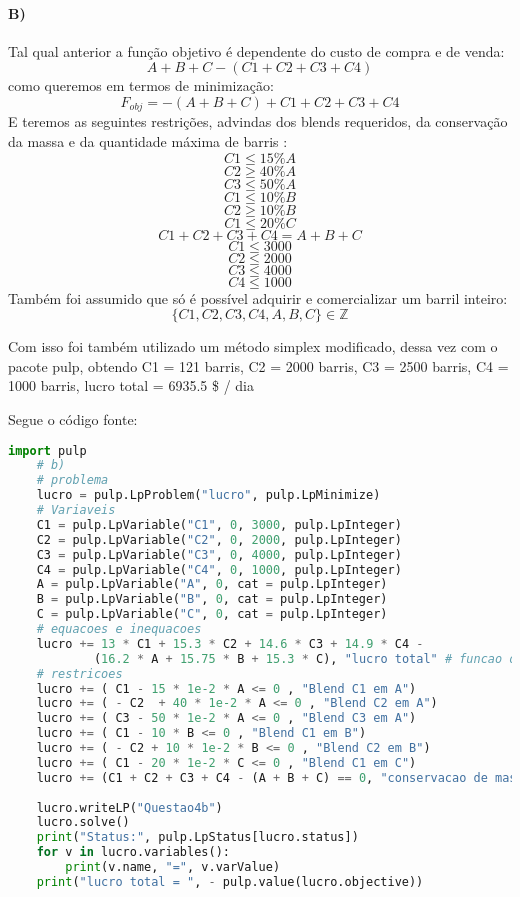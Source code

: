 \documentclass[]{article} %
\begin{document}
\paragraph{B)}
Tal qual anterior a função objetivo é dependente do custo de compra e de venda:
\[ A + B + C - (C1 + C2 + C3 + C4) \]
como queremos em termos de minimização:
\[ F_{obj} = - ( A + B + C ) + C1 + C2 + C3 + C4 \]
E teremos as seguintes restrições, advindas dos blends requeridos, da conservação da massa e da quantidade máxima de barris :
\[ C1 \leqslant  15 \% A \]
\[ C2 \geqslant 40\% A \]
\[ C3 \leqslant  50 \% A \]
\[ C1 \leqslant 10\% B \]
\[ C2 \geqslant 10\% B \]
\[ C1 \leqslant 20\% C \]
\[ C1 + C2 + C3 + C4 = A + B + C \]
\[ C1 \leqslant 3000 \]
\[ C2 \leqslant 2000 \]
\[ C3 \leqslant 4000 \]
\[ C4 \leqslant 1000 \]
Também foi assumido que só é possível adquirir e comercializar um barril inteiro:
\[ \{C1, C2, C3, C4, A, B, C\} \in \mathbb{Z} \]

Com isso foi também utilizado um método simplex modificado, dessa vez com o pacote pulp, obtendo
C1 = 121 barris,
C2 = 2000 barris,
C3 = 2500 barris,
C4 = 1000 barris, lucro total =  6935.5 \$ / dia

Segue o código fonte:
\begin{lstlisting}[language=Python, basicstyle=\small]
    import pulp
    # b)
    # problema
    lucro = pulp.LpProblem("lucro", pulp.LpMinimize)
    # Variaveis
    C1 = pulp.LpVariable("C1", 0, 3000, pulp.LpInteger)
    C2 = pulp.LpVariable("C2", 0, 2000, pulp.LpInteger)
    C3 = pulp.LpVariable("C3", 0, 4000, pulp.LpInteger)
    C4 = pulp.LpVariable("C4", 0, 1000, pulp.LpInteger)
    A = pulp.LpVariable("A", 0, cat = pulp.LpInteger)
    B = pulp.LpVariable("B", 0, cat = pulp.LpInteger)
    C = pulp.LpVariable("C", 0, cat = pulp.LpInteger)
    # equacoes e inequacoes
    lucro += 13 * C1 + 15.3 * C2 + 14.6 * C3 + 14.9 * C4 - 
            (16.2 * A + 15.75 * B + 15.3 * C), "lucro total" # funcao objetivo
    # restricoes
    lucro += ( C1 - 15 * 1e-2 * A <= 0 , "Blend C1 em A")
    lucro += ( - C2  + 40 * 1e-2 * A <= 0 , "Blend C2 em A")
    lucro += ( C3 - 50 * 1e-2 * A <= 0 , "Blend C3 em A")
    lucro += ( C1 - 10 * B <= 0 , "Blend C1 em B")
    lucro += ( - C2 + 10 * 1e-2 * B <= 0 , "Blend C2 em B")
    lucro += ( C1 - 20 * 1e-2 * C <= 0 , "Blend C1 em C")
    lucro += (C1 + C2 + C3 + C4 - (A + B + C) == 0, "conservacao de massa")
    
    lucro.writeLP("Questao4b")
    lucro.solve()
    print("Status:", pulp.LpStatus[lucro.status])
    for v in lucro.variables():
        print(v.name, "=", v.varValue)
    print("lucro total = ", - pulp.value(lucro.objective))
\end{lstlisting}
\end{document}
